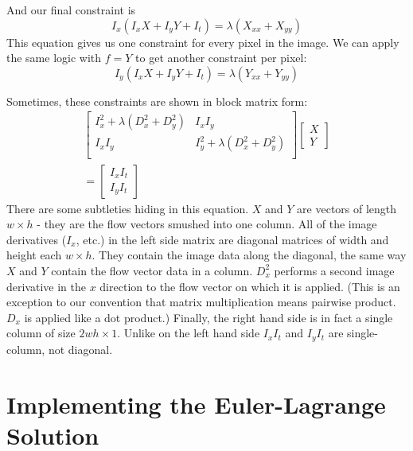 \documentclass[10pt,twocolumn,letterpaper]{article}
\begin{document}
And our final constraint is
\begin{equation} \label{eq:eulerPlug6}
I_x (I_x X + I_y Y + I_t) = \lambda (X_{xx} + X_{yy})
\end{equation}
This equation gives us one constraint for every pixel in the image.  We can apply the same logic with $f=Y$ to get another constraint per pixel:
\begin{equation} \label{eq:eulerPlug7}
I_y (I_x X + I_y Y + I_t) = \lambda (Y_{xx} + Y_{yy})
\end{equation}

Sometimes, these constraints are shown in block matrix form:
\begin{multline} \label{eq:eulerBlock}
\left[ \begin{array}{cc}
I_x^2 + \lambda (D_x^2 + D_y^2) & I_x I_y\\
I_x I_y & I_y^2 + \lambda (D_x^2 + D_y^2) \\
\end{array} \right]
\left[\begin{array}{c}
X \\
Y
\end{array} \right] \\
=\left[ \begin{array}{c}
I_x I_t \\
I_y I_t
\end{array} \right]
\end{multline}
There are some subtleties hiding in this equation.  $X$ and $Y$ are vectors of length $w \times h$ - they are the flow vectors smushed into one column.  All of the image derivatives ($I_x$, etc.) in the left side matrix are diagonal matrices of width and height each $w \times h$.  They contain the image data along the diagonal, the same way $X$ and $Y$ contain the flow vector data in a column.  $D_x^2$ performs a second image derivative in the $x$ direction to the flow vector on which it is applied.  (This is an exception to our convention that matrix multiplication means pairwise product.  $D_x$ is applied like a dot product.)  Finally, the right hand side is in fact a single column of size $2wh \times 1$.  Unlike on the left hand side $I_x I_t$ and $I_y I_t$ are single-column, not diagonal.

\section{Implementing the Euler-Lagrange Solution}
\end{document}
